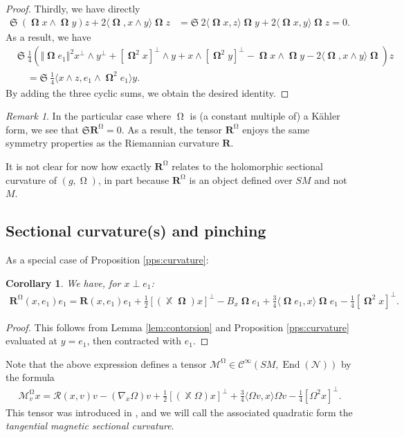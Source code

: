 \documentclass[12pt]{amsart}
\numberwithin{numbering}{section}
\theoremstyle{plain}
\newtheorem{csq}[numbering]{Corollary}
\theoremstyle{definition}
\theoremstyle{remark}
\newtheorem{rmq}[numbering]{Remark}
\numberwithin{equation}{section}
\DeclareMathOperator{\End}{End}
\DeclareMathOperator{\xx}{\mathbb{X}}
\DeclareMathOperator{\oo}{\mathbf{\Omega}}
\DeclareMathOperator{\mg}{\Omega}
\newcommand{\rfm}{\mathbf{R}}
\newcommand{\rsfm}{\mathbf{R}^{\mg}}
\newcommand{\frk}[1]{\mathfrak{#1}}
\begin{document}
\begin{proof}
Thirdly, we have directly 
\begin{align*}
\frk{S} \ (\oo x \wedge \oo y) z + 2 \langle \oo, x \wedge y \rangle \oo z
&= \frk{S} \ 2 \langle \oo x, z \rangle \oo y + 2 \langle \oo x, y \rangle \oo z = 0.
\end{align*}
As a result, we have 
\begin{align*}
&\frk{S} \ \frac{1}{4} (\Vert \oo e_1 \Vert^2 x^\perp \wedge y^\perp + [\oo^2 x]^\perp \wedge y + x \wedge [\oo^2 y]^\perp - \oo x \wedge \oo y - 2 \langle \oo, x \wedge y \rangle \oo) z \\ 
&\quad = \frk{S} \ \frac{1}{4} \langle x \wedge z, e_1 \wedge \oo^2 e_1 \rangle y.
\end{align*}
By adding the three cyclic sums, we obtain the desired identity.
\end{proof}

\begin{rmq} \label{rmq:bianchi_kahler}
In the particular case where $\mg$ is (a constant multiple of) a Kähler form, we see that $\frk{S} \rsfm = 0$. As a result, the tensor $\rsfm$ enjoys the same symmetry properties as the Riemannian curvature $\rfm$. 

It is not clear for now how exactly $\rsfm$ relates to the holomorphic sectional curvature of $(g, \mg)$, in part because $\rsfm$ is an object defined over $SM$ and not $M$.
\end{rmq}


\subsection{Sectional curvature(s) and pinching} \label{sec:sec_curvature}

As a special case of Proposition \ref{pps:curvature}:
\begin{csq}
We have, for $x \perp e_1$:
\begin{align*}
\rsfm(x, e_1) e_1 = \rfm(x, e_1) e_1 + \frac{1}{2} [(\xx \oo) x]^\perp - B_x \oo e_1 + \frac{3}{4} \langle \oo e_1, x \rangle \oo e_1 - \frac{1}{4}  [\oo^2 x]^\perp.
\end{align*}
\end{csq}

\begin{proof}
This follows from Lemma \ref{lem:contorsion} and Proposition \ref{pps:curvature} evaluated at $y = e_1$, then contracted with $e_1$.
\end{proof}

Note that the above expression defines a tensor $\mathcal{M}^{\mg} \in \mathcal{C}^\infty(SM, \End(\mathcal{N}))$ by the formula 
\begin{align} \label{def:tan_mag_sec_curv}
\mathcal{M}^{\mg}_v x = \mathcal{R}(x, v) v - (\nabla_x \Omega) v + \frac{1}{2} [(\xx \Omega) x]^\perp + \frac{3}{4} \langle \Omega v, x \rangle \Omega v - \frac{1}{4} [\Omega^2 x]^\perp.
\end{align}
This tensor was introduced in \cite{assenza2024magnetic}, and we will call the associated quadratic form the \emph{tangential magnetic sectional curvature}. 
\end{document}
